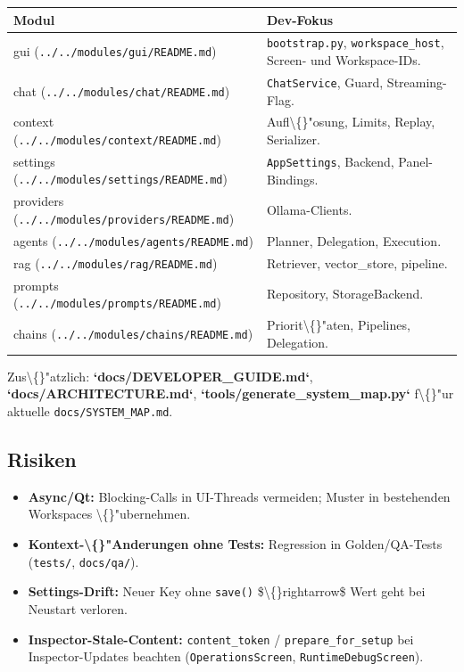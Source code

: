 \begin{center}
\begin{tabular}{ll}
\hline
Modul & Dev-Fokus \\
\hline
gui (\texttt{../../modules/gui/README.md}) & \texttt{bootstrap.py}, \texttt{workspace\_host}, Screen- und Workspace-IDs. \\
chat (\texttt{../../modules/chat/README.md}) & \texttt{ChatService}, Guard, Streaming-Flag. \\
context (\texttt{../../modules/context/README.md}) & Aufl\textbackslash\{\}"osung, Limits, Replay, Serializer. \\
settings (\texttt{../../modules/settings/README.md}) & \texttt{AppSettings}, Backend, Panel-Bindings. \\
providers (\texttt{../../modules/providers/README.md}) & Ollama-Clients. \\
agents (\texttt{../../modules/agents/README.md}) & Planner, Delegation, Execution. \\
rag (\texttt{../../modules/rag/README.md}) & Retriever, vector\_store, pipeline. \\
prompts (\texttt{../../modules/prompts/README.md}) & Repository, StorageBackend. \\
chains (\texttt{../../modules/chains/README.md}) & Priorit\textbackslash\{\}"aten, Pipelines, Delegation. \\
\hline
\end{tabular}
\end{center}

Zus\textbackslash\{\}"atzlich: \textbf{`docs/DEVELOPER\_GUIDE.md`}, \textbf{`docs/ARCHITECTURE.md`}, \textbf{`tools/generate\_system\_map.py`} f\textbackslash\{\}"ur aktuelle \texttt{docs/SYSTEM\_MAP.md}.

\subsection{Risiken}

\begin{itemize}
\item \textbf{Async/Qt:} Blocking-Calls in UI-Threads vermeiden; Muster in bestehenden Workspaces \textbackslash\{\}"ubernehmen.
\item \textbf{Kontext-\textbackslash\{\}"Anderungen ohne Tests:} Regression in Golden/QA-Tests (\texttt{tests/}, \texttt{docs/qa/}).
\item \textbf{Settings-Drift:} Neuer Key ohne \texttt{save()} \$\textbackslash\{\}rightarrow\$ Wert geht bei Neustart verloren.
\item \textbf{Inspector-Stale-Content:} \texttt{content\_token} / \texttt{prepare\_for\_setup} bei Inspector-Updates beachten (\texttt{OperationsScreen}, \texttt{RuntimeDebugScreen}).
\end{itemize}

